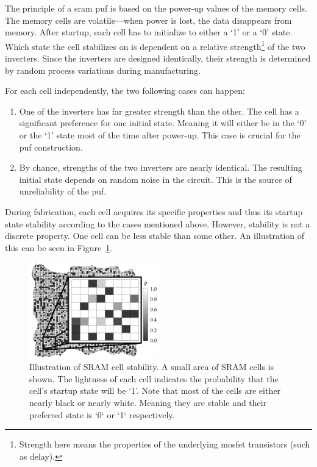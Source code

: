 The principle of a \gls{sram} \gls{puf} is based on the power-up values of the memory cells. The memory cells are volatile---when power is lost, the data disappears from memory. After startup, each cell has to initialize to either a `1' or a `0' state. Which state the cell stabilizes on is dependent on a relative strength\footnote{Strength here means the properties of the underlying \gls{mosfet} transistors (such as delay).} of the two inverters. Since the inverters are designed identically, their strength is determined by random process variations during manufacturing.~\cite{Maes2010}

For each cell independently, the two following cases can happen:

\begin{enumerate}
    \item One of the inverters has far greater strength than the other. The cell has a significant preference for one initial state. Meaning it will either be in the `0' or the `1' state most of the time after power-up. This case is crucial for the \gls{puf} construction.
    \item By chance, strengths of the two inverters are nearly identical. The resulting initial state depends on random noise in the circuit. This is the source of unreliability of the \gls{puf}.
\end{enumerate}

During fabrication, each cell acquires its specific properties and thus its startup state stability according to the cases mentioned above. However, stability is not a discrete property. One cell can be less stable than some other. An illustration of this can be seen in Figure~\ref{fig:sram_puf_stability}.

\begin{figure}[ht!]
    \centering
    \captionsetup{justification=justified,margin=0.5cm}
    \includegraphics[width=0.5\textwidth]{images/sram_puf_stability.jpg}
    \caption[Illustration of SRAM cell stability.]{Illustration of SRAM cell stability. A small area of SRAM cells is shown. The lightness of each cell indicates the probability that the cell's startup state will be `1'. Note that most of the cells are either nearly black or nearly white. Meaning they are stable and their preferred state is `0` or `1` respectively.~\cite{Holcomb2009}}
    \label{fig:sram_puf_stability}
\end{figure}

